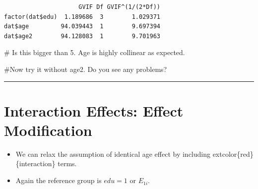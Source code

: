 \documentclass[
  letterpaper,
  DIV=11,
  numbers=noendperiod]{scrreprt}
\newenvironment{Shaded}{\begin{snugshade}}{\end{snugshade}}
\newcommand{\AttributeTok}[1]{\textcolor[rgb]{0.40,0.45,0.13}{#1}}
\newcommand{\CommentTok}[1]{\textcolor[rgb]{0.37,0.37,0.37}{#1}}
\newcommand{\DecValTok}[1]{\textcolor[rgb]{0.68,0.00,0.00}{#1}}
\newcommand{\FunctionTok}[1]{\textcolor[rgb]{0.28,0.35,0.67}{#1}}
\newcommand{\NormalTok}[1]{\textcolor[rgb]{0.00,0.23,0.31}{#1}}
\newcommand{\OtherTok}[1]{\textcolor[rgb]{0.00,0.23,0.31}{#1}}
\newcommand{\SpecialCharTok}[1]{\textcolor[rgb]{0.37,0.37,0.37}{#1}}
\providecommand{\tightlist}{%
  \setlength{\itemsep}{0pt}\setlength{\parskip}{0pt}}\usepackage{longtable,booktabs,array}
\begin{document}
\begin{Shaded}
\end{Shaded}

\begin{verbatim}
                     GVIF Df GVIF^(1/(2*Df))
factor(dat$edu)  1.189686  3        1.029371
dat$age         94.039443  1        9.697394
dat$age2        94.128083  1        9.701963
\end{verbatim}

\begin{Shaded}
\begin{Highlighting}[]
\CommentTok{\# Is this bigger than 5. Age is highly collinear as expected.}


\CommentTok{\#Now try it without age2. Do you see any problems?}
\end{Highlighting}
\end{Shaded}

\begin{center}\rule{0.5\linewidth}{0.5pt}\end{center}

\hypertarget{interaction-effects-effect-modification}{%
\section*{Interaction Effects: Effect
Modification}\label{interaction-effects-effect-modification}}


\begin{itemize}
\tightlist
\item
  We can relax the assumption of identical age effect by including
  extcolor\{red\}\{interaction\} terms.
\item
  Again the reference group is \(edu=1\) or \(E_{1i}\).
\end{itemize}
\end{document}
